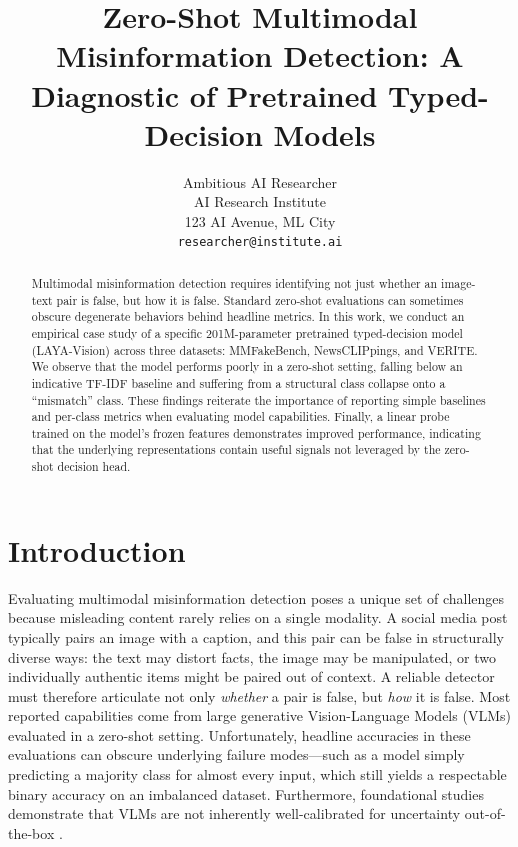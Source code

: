 \documentclass{article} %
\title{Zero-Shot Multimodal Misinformation Detection: A Diagnostic of Pretrained Typed-Decision Models}
\author{Ambitious AI Researcher\\
AI Research Institute\\
123 AI Avenue, ML City\\
\texttt{researcher@institute.ai}
}
\begin{document}
\maketitle

\begin{abstract}
Multimodal misinformation detection requires identifying not just whether an image-text pair is false, but how it is false. Standard zero-shot evaluations can sometimes obscure degenerate behaviors behind headline metrics. In this work, we conduct an empirical case study of a specific 201M-parameter pretrained typed-decision model (LAYA-Vision) across three datasets: MMFakeBench, NewsCLIPpings, and VERITE. We observe that the model performs poorly in a zero-shot setting, falling below an indicative TF-IDF baseline and suffering from a structural class collapse onto a ``mismatch'' class. These findings reiterate the importance of reporting simple baselines and per-class metrics when evaluating model capabilities. Finally, a linear probe trained on the model's frozen features demonstrates improved performance, indicating that the underlying representations contain useful signals not leveraged by the zero-shot decision head.
\end{abstract}

\section{Introduction}
\label{sec:intro}
Evaluating multimodal misinformation detection poses a unique set of challenges because misleading content rarely relies on a single modality. A social media post typically pairs an image with a caption, and this pair can be false in structurally diverse ways: the text may distort facts, the image may be manipulated, or two individually authentic items might be paired out of context. A reliable detector must therefore articulate not only \textit{whether} a pair is false, but \textit{how} it is false. Most reported capabilities come from large generative Vision-Language Models (VLMs) evaluated in a zero-shot setting. Unfortunately, headline accuracies in these evaluations can obscure underlying failure modes---such as a model simply predicting a majority class for almost every input, which still yields a respectable binary accuracy on an imbalanced dataset. Furthermore, foundational studies demonstrate that VLMs are not inherently well-calibrated for uncertainty out-of-the-box \citep{Tu2024EmpiricalInto}.
\end{document}

